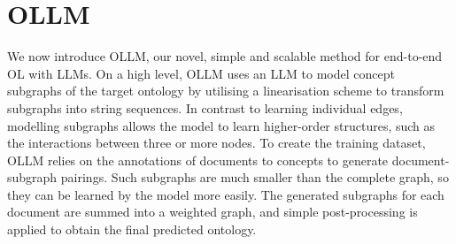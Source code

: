 \documentclass{article}
\newcommand{\todo}[1]{\textcolor{red}{TODO: #1}}
\newcommand{\name}{{OLLM}\xspace}
\begin{document}

\section{\name}

We now introduce \name, our novel, simple and scalable method for end-to-end OL with LLMs. On a high level, \name uses an LLM to model concept subgraphs of the target ontology by utilising a linearisation scheme to transform subgraphs into string sequences. In contrast to learning individual edges, modelling subgraphs allows the model to learn higher-order structures, such as the interactions between three or more nodes. To create the training dataset, \name relies on the annotations of documents to concepts to generate document-subgraph pairings. Such subgraphs are much smaller than the complete graph, so they can be learned by the model more easily. The generated subgraphs for each document are summed into a weighted graph, and simple post-processing is applied to obtain the final predicted ontology.

\end{document}
